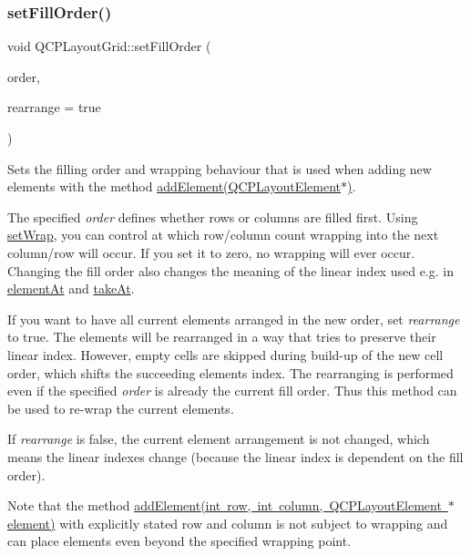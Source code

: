 \subsubsection{\texorpdfstring{setFillOrder()}{setFillOrder()}}
{\footnotesize\ttfamily void Q\+C\+P\+Layout\+Grid\+::set\+Fill\+Order (\begin{DoxyParamCaption}\item[{\mbox{\hyperlink{class_q_c_p_layout_grid_a7d49ee08773de6b2fd246edfed353cca}{Fill\+Order}}}]{order,  }\item[{bool}]{rearrange = {\ttfamily true} }\end{DoxyParamCaption})}

Sets the filling order and wrapping behaviour that is used when adding new elements with the method \mbox{\hyperlink{class_q_c_p_layout_grid_a4c44025dd25acd27e053cadfd448ad7b}{add\+Element(\+Q\+C\+P\+Layout\+Element$\ast$)}}.

The specified {\itshape order} defines whether rows or columns are filled first. Using \mbox{\hyperlink{class_q_c_p_layout_grid_ab36af18d77e4428386d02970382ee598}{set\+Wrap}}, you can control at which row/column count wrapping into the next column/row will occur. If you set it to zero, no wrapping will ever occur. Changing the fill order also changes the meaning of the linear index used e.\+g. in \mbox{\hyperlink{class_q_c_p_layout_grid_a4288f174082555f6bd92021bdedb75dc}{element\+At}} and \mbox{\hyperlink{class_q_c_p_layout_grid_a17dd220234d1bbf8835abcc666384d45}{take\+At}}.

If you want to have all current elements arranged in the new order, set {\itshape rearrange} to true. The elements will be rearranged in a way that tries to preserve their linear index. However, empty cells are skipped during build-\/up of the new cell order, which shifts the succeeding element\textquotesingle{}s index. The rearranging is performed even if the specified {\itshape order} is already the current fill order. Thus this method can be used to re-\/wrap the current elements.

If {\itshape rearrange} is false, the current element arrangement is not changed, which means the linear indexes change (because the linear index is dependent on the fill order).

Note that the method \mbox{\hyperlink{class_q_c_p_layout_grid_adff1a2ca691ed83d2d24a4cd1fe17012}{add\+Element(int row, int column, Q\+C\+P\+Layout\+Element $\ast$element)}} with explicitly stated row and column is not subject to wrapping and can place elements even beyond the specified wrapping point.

